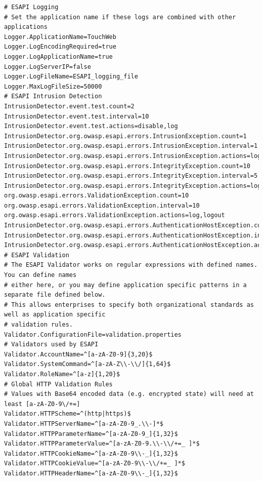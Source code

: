 \begin{lstlisting}
# ESAPI Logging
# Set the application name if these logs are combined with other applications
Logger.ApplicationName=TouchWeb
Logger.LogEncodingRequired=true
Logger.LogApplicationName=true
Logger.LogServerIP=false
Logger.LogFileName=ESAPI_logging_file
Logger.MaxLogFileSize=50000
# ESAPI Intrusion Detection
IntrusionDetector.event.test.count=2
IntrusionDetector.event.test.interval=10
IntrusionDetector.event.test.actions=disable,log
IntrusionDetector.org.owasp.esapi.errors.IntrusionException.count=1
IntrusionDetector.org.owasp.esapi.errors.IntrusionException.interval=1
IntrusionDetector.org.owasp.esapi.errors.IntrusionException.actions=log,disable,logout
IntrusionDetector.org.owasp.esapi.errors.IntegrityException.count=10
IntrusionDetector.org.owasp.esapi.errors.IntegrityException.interval=5
IntrusionDetector.org.owasp.esapi.errors.IntegrityException.actions=log,disable,logout
org.owasp.esapi.errors.ValidationException.count=10
org.owasp.esapi.errors.ValidationException.interval=10
org.owasp.esapi.errors.ValidationException.actions=log,logout
IntrusionDetector.org.owasp.esapi.errors.AuthenticationHostException.count=2
IntrusionDetector.org.owasp.esapi.errors.AuthenticationHostException.interval=10
IntrusionDetector.org.owasp.esapi.errors.AuthenticationHostException.actions=log,logout
# ESAPI Validation
# The ESAPI Validator works on regular expressions with defined names. You can define names
# either here, or you may define application specific patterns in a separate file defined below.
# This allows enterprises to specify both organizational standards as well as application specific
# validation rules.
Validator.ConfigurationFile=validation.properties
# Validators used by ESAPI
Validator.AccountName=^[a-zA-Z0-9]{3,20}$
Validator.SystemCommand=^[a-zA-Z\\-\\/]{1,64}$
Validator.RoleName=^[a-z]{1,20}$
# Global HTTP Validation Rules
# Values with Base64 encoded data (e.g. encrypted state) will need at least [a-zA-Z0-9\/+=]
Validator.HTTPScheme=^(http|https)$
Validator.HTTPServerName=^[a-zA-Z0-9_.\\-]*$
Validator.HTTPParameterName=^[a-zA-Z0-9_]{1,32}$
Validator.HTTPParameterValue=^[a-zA-Z0-9.\\-\\/+=_ ]*$
Validator.HTTPCookieName=^[a-zA-Z0-9\\-_]{1,32}$
Validator.HTTPCookieValue=^[a-zA-Z0-9\\-\\/+=_ ]*$
Validator.HTTPHeaderName=^[a-zA-Z0-9\\-_]{1,32}$

\end{lstlisting}
